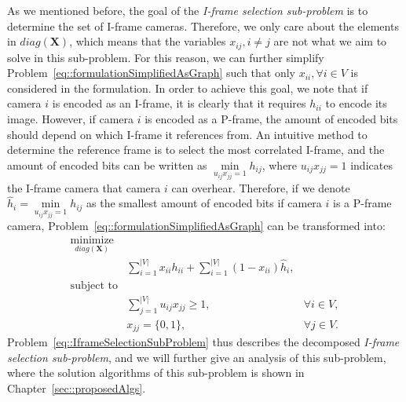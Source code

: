 As we mentioned before, the goal of the \emph{I-frame selection sub-problem} is to determine the set of I-frame cameras.
Therefore, we only care about the elements in $diag(\mathbf{X})$, which means that the variables $x_{ij}, i \neq j$ are not what we aim to solve in this sub-problem.
For this reason, we can further simplify Problem~\eqref{eq::formulationSimplifiedAsGraph} such that only $x_{ii}, \forall i \in V$ is considered in the formulation.
In order to achieve this goal, we note that if camera $i$ is encoded as an I-frame, it is clearly that it requires $h_{ii}$ to encode its image.
However, if camera $i$ is encoded as a P-frame, the amount of encoded bits should depend on which I-frame it references from.
An intuitive method to determine the reference frame is to select the most correlated I-frame, and the amount of encoded bits can be written as $\underset{u_{ij}x_{jj} = 1}{\min} h_{ij}$, where $u_{ij}x_{jj} = 1$ indicates the I-frame camera that camera $i$ can overhear.
Therefore, if we denote ${\hat{h}_i = \underset{u_{ij}x_{jj} = 1}{\min} h_{ij}}$ as the smallest amount of encoded bits if camera $i$ is a P-frame camera, Problem~\eqref{eq::formulationSimplifiedAsGraph} can be transformed into:
\begin{align}
\underset{diag(\mathbf{X})}{\text{minimize}} & & \nonumber \\
	&\sum_{i=1}^{|V|} x_{ii}h_{ii} + \sum_{i=1}^{|V|} (1-x_{ii}) \hat{h}_i, & \nonumber \\
\text{subject to} & & \nonumber \\
	&\sum_{j=1}^{|V|} u_{ij} x_{jj} \geq 1, &\forall i \in V, \nonumber \\
	&x_{jj} = \{0,1\}, &\forall j \in V.  
\label{eq::IframeSelectionSubProblem}
\end{align}
Problem~\eqref{eq::IframeSelectionSubProblem} thus describes the decomposed \emph{I-frame selection sub-problem}, and we will further give an analysis of this sub-problem, where the solution algorithms of this sub-problem is shown in Chapter~\ref{sec::proposedAlgs}.

%
